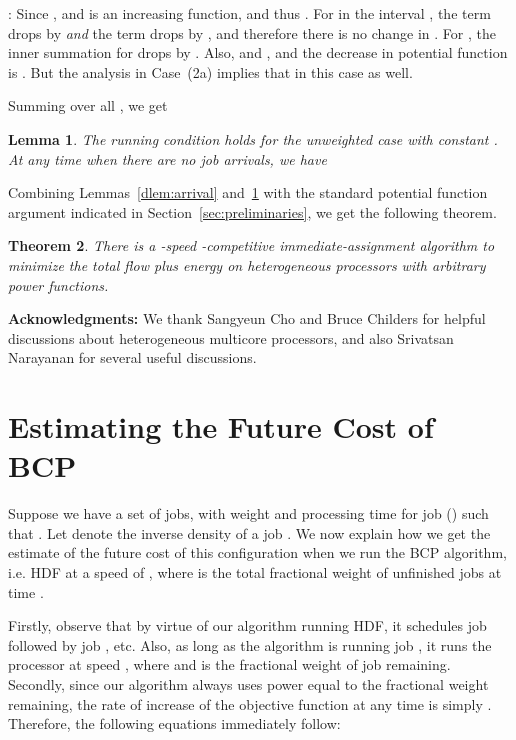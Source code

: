 \documentclass[11pt]{article}
\newtheorem{lemma}{Lemma}[section]
\newtheorem{theorem}[lemma]{Theorem}
\begin{document}
\medskip {}: Since , and  is an increasing
function,  and thus . For  in the
interval , the term  drops by  \emph{and} the term
 drops by , and therefore there is no change in
. For , the inner
summation for  drops by . Also,  and
, and the decrease in potential function is . But the analysis in Case~(2a) implies that  in this case as well.

Summing over all , we
get
\begin{lemma}
  \label{dlem:running}
  The running condition holds for the unweighted case with constant .
  At any time  when there are no job arrivals, we have
\end{lemma}
Combining Lemmas~\ref{dlem:arrival} and~\ref{dlem:running} with the
standard potential function argument indicated in
Section~\ref{sec:preliminaries}, we get the following theorem.
\begin{theorem}
  \label{dthm:unwtd}
  There is a -speed -competitive
  immediate-assignment algorithm to minimize the total flow plus energy on
  heterogeneous processors with arbitrary power functions.
\end{theorem}


\bigskip
\noindent
{\bf Acknowledgments:} We thank Sangyeun Cho and Bruce Childers for helpful discussions
about heterogeneous multicore processors, and also Srivatsan Narayanan for several useful discussions.






\appendix

\section{Estimating the Future Cost of BCP}
\label{sec:cost-estimate}
Suppose we have a set of  jobs, with weight  and processing time
 for job  () such that . Let  denote the inverse density of a job .
We now explain how we get the estimate of the future cost of this configuration
when we run the BCP algorithm, i.e. HDF at a speed of , where  is the total fractional weight
of unfinished jobs at time .

Firstly, observe that by virtue of our algorithm running HDF, it schedules job  followed by job , etc.
Also, as long as the algorithm is running job , it runs the processor at speed
, where  and  is
the fractional weight of job  remaining.
Secondly, since our algorithm always uses power equal to the fractional weight remaining, the rate of increase of the objective function at any time  is simply .
Therefore, the following equations immediately follow:
\end{document}
